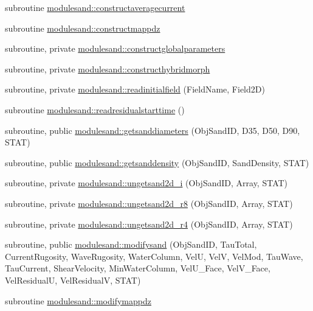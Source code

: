 \begin{DoxyCompactItemize}
\item 
subroutine \mbox{\hyperlink{namespacemodulesand_a04e1a85e46e9df0c79bdc0d537788c96}{modulesand\+::constructaveragecurrent}}
\item 
subroutine \mbox{\hyperlink{namespacemodulesand_a1fe3b75c21e01743ffaa043028b925b6}{modulesand\+::constructmappdz}}
\item 
subroutine, private \mbox{\hyperlink{namespacemodulesand_a3f94338f096f34936302bce0d7d91189}{modulesand\+::constructglobalparameters}}
\item 
subroutine, private \mbox{\hyperlink{namespacemodulesand_a5038864653c40852814080f8d2e82d7b}{modulesand\+::constructhybridmorph}}
\item 
subroutine, private \mbox{\hyperlink{namespacemodulesand_aa61dae13b284d7fedb73976eb0340e68}{modulesand\+::readinitialfield}} (Field\+Name, Field2D)
\item 
subroutine \mbox{\hyperlink{namespacemodulesand_a402ee8638c7fb9c825536051d1a6c5e8}{modulesand\+::readresidualstarttime}} ()
\item 
subroutine, public \mbox{\hyperlink{namespacemodulesand_a622d6481ea9786885f9078db350e31ca}{modulesand\+::getsanddiameters}} (Obj\+Sand\+ID, D35, D50, D90, S\+T\+AT)
\item 
subroutine, public \mbox{\hyperlink{namespacemodulesand_a4e0db1b5661a069c0d842ef833c61439}{modulesand\+::getsanddensity}} (Obj\+Sand\+ID, Sand\+Density, S\+T\+AT)
\item 
subroutine, private \mbox{\hyperlink{namespacemodulesand_a4daaa1c74789b3c8e2b813c33c5dd7f4}{modulesand\+::ungetsand2d\+\_\+i}} (Obj\+Sand\+ID, Array, S\+T\+AT)
\item 
subroutine, private \mbox{\hyperlink{namespacemodulesand_ab4572edb29539b65dc7c75cb29005448}{modulesand\+::ungetsand2d\+\_\+r8}} (Obj\+Sand\+ID, Array, S\+T\+AT)
\item 
subroutine, private \mbox{\hyperlink{namespacemodulesand_aebab0f132145eea11b487947d2b9b3f1}{modulesand\+::ungetsand2d\+\_\+r4}} (Obj\+Sand\+ID, Array, S\+T\+AT)
\item 
subroutine, public \mbox{\hyperlink{namespacemodulesand_a72127773a460332746476a09b3380e49}{modulesand\+::modifysand}} (Obj\+Sand\+ID, Tau\+Total, Current\+Rugosity, Wave\+Rugosity, Water\+Column, VelU, VelV, Vel\+Mod, Tau\+Wave, Tau\+Current, Shear\+Velocity, Min\+Water\+Column, Vel\+U\+\_\+\+Face, Vel\+V\+\_\+\+Face, Vel\+ResidualU, Vel\+ResidualV, S\+T\+AT)
\item 
subroutine \mbox{\hyperlink{namespacemodulesand_a49934851385611f48a356e02d5c0f1e1}{modulesand\+::modifymappdz}}

\end{DoxyCompactItemize}
